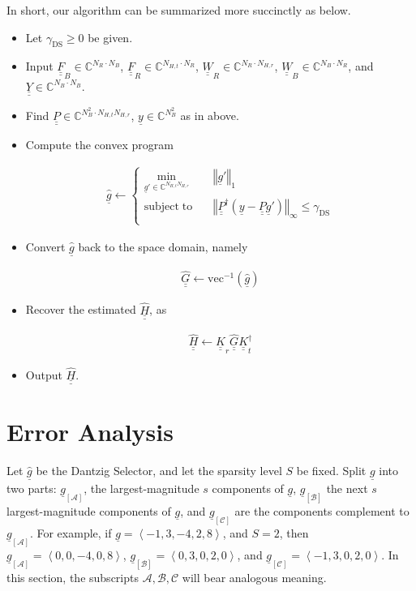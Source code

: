 \documentclass[journal]{IEEEtran}
\newcommand {\g} {\gamma}
\newcommand {\D} {\cdot}
\newcommand {\m} [1] {\( #1 \)}
\newcommand {\V} [1] {\underline {#1}}
\newcommand {\M} [1] {\underline {\underline {#1}}}
\newcommand {\RB} [1] {\left( #1 \right)}
\newcommand {\SB} [1] {\left[ #1 \right]}
\newcommand {\VNm} [1] {\left \Vert #1 \right \Vert}
\newcommand {\Min} [1] {\underset {#1} {\mathrm {min}}\;}
\newcommand {\IP} [1] {\left \langle #1 \right \rangle}
\newcommand {\Disp} [1] {
   \begin {align*}
      #1
   \end {align*}
}
\begin{document}
In short, our algorithm can be summarized more succinctly as below.
\begin {itemize}
\item Let \m {\g_{\mathrm {DS}} \geq 0} be given.
\item Input \m {\M {F} _B \in \mathbb {C} ^{N_R \D N_B}},
\m {\M {F} _R \in \mathbb {C} ^{N_{H,t} \D N_R}},
\m {\M {W} _R \in \mathbb {C} ^{N_R \D N_{H,r}}},
\m {\M {W} _B \in \mathbb {C} ^{N_B \D N_R}},
and \m {\M {Y} \in \mathbb {C} ^{N_B \D N_B}}.
\item Find \m {\M {P} \in \mathbb {C} ^{N_B ^2 \D N_{H,t} N_{H,r}}}, \m {\V {y} \in \mathbb {C} ^{N_B ^2}} as in above.
\item Compute the convex program
\Disp {
\hat {\V {g}}
\leftarrow \begin {cases}
\Min {\V {g}' \in \mathbb {C} ^{N_{H,t} N_{H,r}}} & \VNm {\V {g}'} _1 \\
\mathrm {subject} \; \mathrm {to} \quad & \VNm {\M {P}^\dagger \RB {\V {y} -\M {P} \V {g}'}} _\infty \leq \g_{\mathrm {DS}} \\
\end {cases} 
}
\item Convert \m {\hat {\V {g}}} back to the space domain, namely
\Disp {
\hat {\M {G}}
\leftarrow \mathrm {vec}^{-1} \RB {\hat {\V {g}}} 
}
\item Recover the estimated \m {\hat {\M {H}}}, as
\Disp {
\hat {\M {H}}
\leftarrow \M {K} _r \hat {\M {G}} \M {K}^\dagger _t
}
\item Output \m {\hat {\M {H}}}.
\end {itemize}


\section{Error Analysis}

Let \m {\hat {\V {g}}} be the Dantzig Selector, and let the sparsity level \m {S} be fixed.
Split \m {\V {g}} into two parts: \m {\V {g} _{\SB{\mathcal {A}}}}, the largest-magnitude \m {s} components of \m {\V {g}}, \m {\V {g} _{\SB{\mathcal {B}}}} the next \m {s} largest-magnitude components of \m {\V {g}}, and \m {\V {g} _{\SB{\mathcal {C}}}} are the components complement to \m {\V {g} _{\SB{\mathcal {A}}}}.
For example, if \m {\V {g} =\IP {-1,3,-4,2,8}}, and \m {S=2}, then \m {\V {g} _{\SB{\mathcal {A}}} =\IP {0,0,-4,0,8}}, \m {\V {g} _{\SB{\mathcal {B}}} =\IP {0,3,0,2,0}}, and \m {\V {g} _{\SB{\mathcal {C}}} =\IP {-1,3,0,2,0}}.
In this section, the subscripts \m {\mathcal {A}, \mathcal {B}, \mathcal {C}} will bear analogous meaning.
\end{document}
